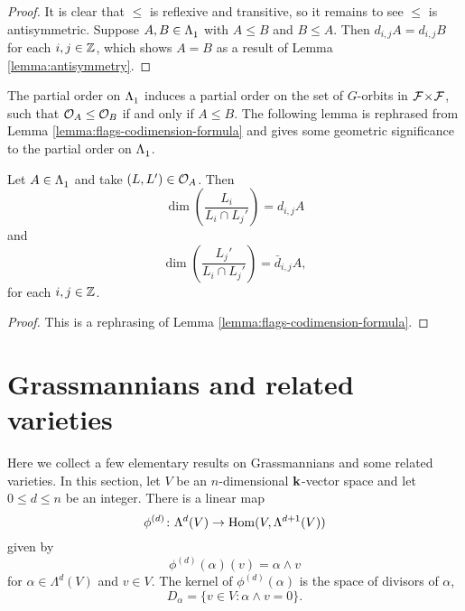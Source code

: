 \documentclass[a4paper, 11pt]{report}
\begin{document}
\begin{proof}
It is clear that $\le$ is reflexive and transitive, so it remains to see $\le$ is antisymmetric. Suppose $A,B\in\Lambda_1^{}$ with $A\le B$ and $B\le A$. Then $d_{i,j}A = d_{i,j}B$ for each $i,j\in\mathbb{Z}$, which shows $A=B$ as a result of Lemma \ref{lemma:antisymmetry}.  
\end{proof}

The partial order on $\Lambda_1^{}$ induces a partial order on the set of $G$-orbits in ${\mathcal{F}\!\times\!\mathcal{F}}$, such that $\mathcal{O}_{A}\le \mathcal{O}_{B}$ if and only if $A\le B$. The following lemma is rephrased from Lemma \ref{lemma:flags-codimension-formula} and gives some geometric significance to the partial order on $\Lambda_1^{}$.

\begin{lemma}\label{lemma:codimension-formula-corner-sums}
Let $A\in\Lambda_1^{}$ and take $(L,L')\in\mathcal{O}_{A}$. Then
\begin{equation*}
\dim\left(\frac{L_i}{L_i\cap L_j'}\right) = d_{i,j}{A}
\end{equation*}
and
\begin{equation*}
\dim\left(\frac{L_j'}{L_i\cap L_j'}\right) = \bar{d}_{i,j}{A},
\end{equation*}
for each $i,j\in\mathbb{Z}$.
\end{lemma}
\begin{proof}
This is a rephrasing of Lemma \ref{lemma:flags-codimension-formula}.
\end{proof}


\section{Grassmannians and related varieties}

Here we collect a few elementary results on Grassmannians and some related varieties. In this section, let $V$ be an $n$-dimensional $\mathbf{k}$-vector space and let $0\le d\le n$ be an integer. There is a linear map
\begin{equation*}
\phi^{(d)}\colon\Lambda^d(V)\to\operatorname{Hom}(V,\Lambda^{d+1}(V))
\end{equation*}
given by
\begin{equation*}
\phi^{(d)}(\alpha)(v)=\alpha\wedge v
\end{equation*}
for $\alpha\in\Lambda^d(V)$ and $v\in V$.
The kernel of $\phi^{(d)}(\alpha)$ is the space of divisors of $\alpha$,
\begin{equation*}
D_\alpha=\{v\in V:\alpha\wedge v=0\}.
\end{equation*}
\end{document}
